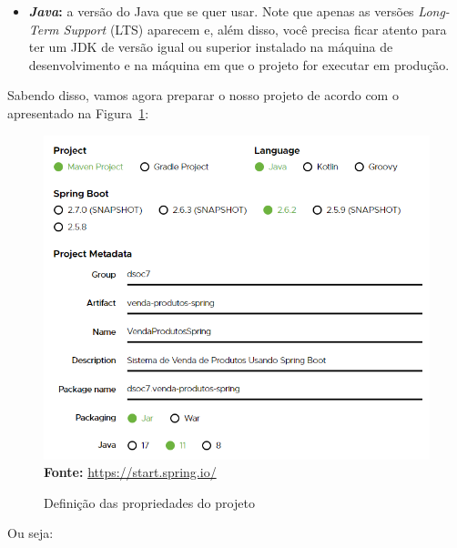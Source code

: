 \begin{itemize}
\begin{itemize}
        \item \textbf{\textit{Java}:} a versão do Java que se quer usar. Note que apenas as versões \textit{Long-Term Support} (LTS) aparecem e, além disso, você precisa ficar atento para ter um JDK de versão igual ou superior instalado na máquina de desenvolvimento e na máquina em que o projeto for executar em produção.
        
    \end{itemize}
\end{itemize}

Sabendo disso, vamos agora preparar o nosso projeto de acordo com o apresentado na Figura~\ref{fig:cap10SpringInitializrConfProjeto01}:

\FloatBarrier
\begin{figure}[!htbp]
    \centering
    \caption{Definição das propriedades do projeto}
    \includegraphics[scale=0.7]{imagens/cap10SpringInitializrConfProjeto01}
    \\\textbf{Fonte:} \url{https://start.spring.io/}
    \label{fig:cap10SpringInitializrConfProjeto01}
\end{figure}
\FloatBarrier

Ou seja:

